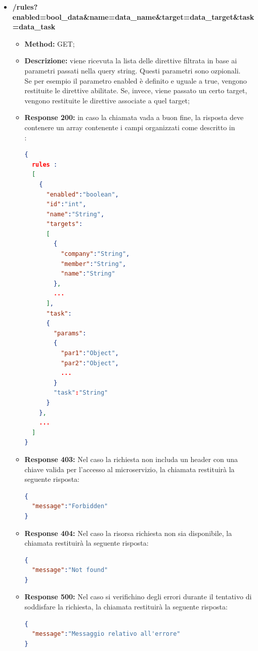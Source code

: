 \begin{itemize}

\item \textbf{/rules?enabled=bool\_data\&name=data\_name\&target=data\_target\&task=data\_task}

\begin{itemize}
\item \textbf{Method:} GET;
\item \textbf{Descrizione:} viene ricevuta la lista delle direttive filtrata in base ai parametri passati nella query string. Questi parametri sono ozpionali.\\
Se per esempio il parametro enabled è definito e uguale a true, vengono restituite le direttive abilitate.
Se, invece, viene passato un certo target, vengono restituite le direttive associate a quel target;
\item \textbf{Response 200:} in caso la chiamata vada a buon fine, la risposta deve contenere un array contenente i campi organizzati come descritto in \\:
\begin{lstlisting}[language=json,firstnumber=1]
{
  rules :
  [
    {
      "enabled":"boolean",
      "id":"int",
      "name":"String",
      "targets":
      [
        {
          "company":"String",
          "member":"String",
          "name":"String"
        },
        ...
      ],
      "task":
      {
        "params":
        {
          "par1":"Object",
          "par2":"Object",
          ...
        }
        "task":"String"
      }
    },
    ...
  ]
}
\end{lstlisting}
\item \textbf{Response 403:} Nel caso la richiesta non includa un header  con una chiave valida per l'accesso al microservizio, la chiamata restituirà la seguente risposta:
\begin{lstlisting}[language=json,firstnumber=1]
{
  "message":"Forbidden"
}
\end{lstlisting}
\item \textbf{Response 404:} Nel caso la risorsa richiesta non sia disponibile, la chiamata restituirà la seguente risposta:
\begin{lstlisting}[language=json,firstnumber=1]
{
  "message":"Not found"
}
\end{lstlisting}
\item \textbf{Response 500:} Nel caso si verifichino degli errori durante il tentativo di soddisfare la richiesta, la chiamata restituirà la seguente risposta:
\begin{lstlisting}[language=json,firstnumber=1]
{
  "message":"Messaggio relativo all'errore"
}
\end{lstlisting}
\end{itemize}


\end{itemize}
